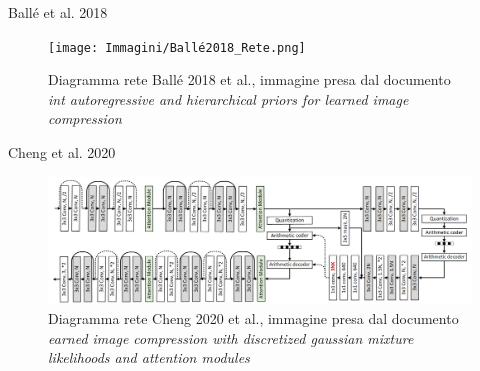     \begin{frame}{Ballé et al\footnotemark[1]. 2018}
        \begin{figure}[!h]
            \centering
            \texttt{[image: Immagini/Ballé2018\_Rete.png]}
            \caption{Diagramma rete Ballé 2018 et al., immagine presa dal documento \textit{int autoregressive and hierarchical priors for learned image compression}\footnotemark[1]}
            \label{fig:balle2018Network}
        \end{figure}
    \end{frame}

    \begin{frame}{Cheng et al\footnotemark[1]. 2020}
        \begin{figure}[!h]
            \centering
            \includegraphics[width=1\textwidth]{Immagini/Cheng2020_Rete.png}
            \caption{Diagramma rete Cheng 2020 et al., immagine presa dal documento \textit{earned image compression with discretized gaussian mixture likelihoods and attention modules}\footnotemark[1]}
            \label{fig:cheng2020Network}
        \end{figure}
    \end{frame}

